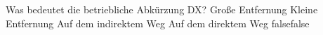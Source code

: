     {Was bedeutet die betriebliche Abkürzung DX?}
    {Große Entfernung }
    {Kleine Entfernung }
    {Auf dem indirektem Weg}
    {Auf dem direktem Weg}
    {false}{false}